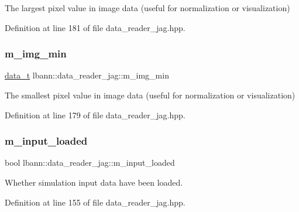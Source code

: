 The largest pixel value in image data (useful for normalization or visualization) 



Definition at line 181 of file data\+\_\+reader\+\_\+jag.\+hpp.

\mbox{\label{classlbann_1_1data__reader__jag_a273907a834d9bd234b21f88ee72076be}} 
\subsubsection{\texorpdfstring{m\+\_\+img\+\_\+min}{m\_img\_min}}
{\footnotesize\ttfamily \hyperlink{classlbann_1_1data__reader__jag_a7377d6c02c455f019a378489b9b8eab4}{data\+\_\+t} lbann\+::data\+\_\+reader\+\_\+jag\+::m\+\_\+img\+\_\+min\hspace{0.3cm}{\ttfamily [protected]}}



The smallest pixel value in image data (useful for normalization or visualization) 



Definition at line 179 of file data\+\_\+reader\+\_\+jag.\+hpp.

\mbox{\label{classlbann_1_1data__reader__jag_ae047bbae82c4a8eceedceeea2e1815ad}} 
\subsubsection{\texorpdfstring{m\+\_\+input\+\_\+loaded}{m\_input\_loaded}}
{\footnotesize\ttfamily bool lbann\+::data\+\_\+reader\+\_\+jag\+::m\+\_\+input\+\_\+loaded\hspace{0.3cm}{\ttfamily [protected]}}



Whether simulation input data have been loaded. 



Definition at line 155 of file data\+\_\+reader\+\_\+jag.\+hpp.

